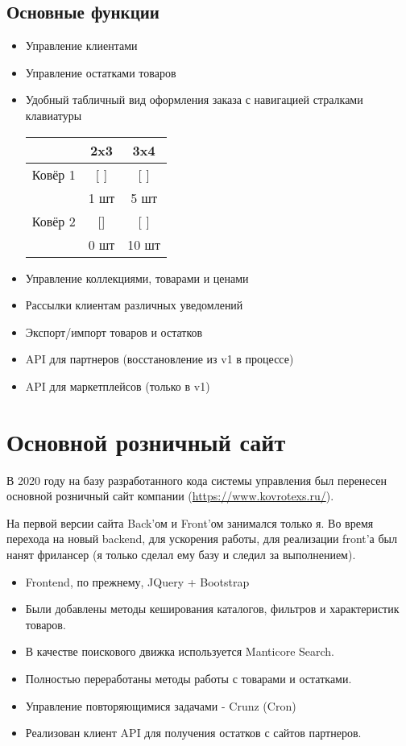 \documentclass[10pt]{tpl/developercv} %
\begin{document}
\subsection{Основные функции}
\begin{itemize}
  \item Управление клиентами
  \item Управление остатками товаров
  \item {
    Удобный табличный вид оформления заказа с навигацией стралками клавиатуры
    \begin{center}
      \begin{tabular}{ |c|c|c| }
        \hline
        & 2x3 & 3x4 \\
        \hline
         Ковёр 1 & [  ] & [  ] \\
                & 1 шт & 5 шт \\
        \hline
         Ковёр 2 & [] & [  ] \\
                & 0 шт & 10 шт \\
        \hline
      \end{tabular}
    \end{center}
  }
  \item Управление коллекциями, товарами и ценами
  \item Рассылки клиентам различных уведомлений
  \item Экспорт/импорт товаров и остатков
  \item API для партнеров (восстановление из v1 в процессе)
  \item API для маркетплейсов (только в v1)
\end{itemize}

\section{Основной розничный сайт}
В 2020 году на базу разработанного кода системы управления был перенесен основной розничный сайт компании (\href{https://www.kovrotexs.ru/}{https://www.kovrotexs.ru/}).

На первой версии сайта Back'ом и Front'ом занимался только я. Во время перехода на новый backend, для ускорения работы, для реализации front'а был нанят фрилансер (я только сделал ему базу и следил за выполнением).

\begin{itemize}
  \item Frontend, по прежнему, JQuery + Bootstrap
  \item Были добавлены методы кеширования каталогов, фильтров и характеристик товаров.
  \item В качестве поискового движка используется Manticore Search.
  \item Полностью переработаны методы работы с товарами и остатками.
  \item Управление повторяющимися задачами - Crunz (Cron)
  \item Реализован клиент API для получения остатков с сайтов партнеров.
\end{itemize}
\end{document}
